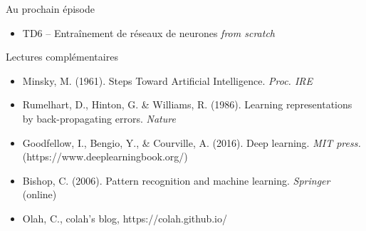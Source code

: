 \documentclass[12pt,dvipsnames,aspectratio=169]{beamer}
\begin{document}
\begin{frame}{Au prochain épisode}

    \begin{itemize}
        \item TD6 -- Entraînement de réseaux de neurones \textit{from scratch}
    \end{itemize}

    \begin{block}{Lectures complémentaires}

    \begin{itemize}
        \item Minsky, M. (1961). Steps Toward Artificial Intelligence.  \textit{Proc. IRE}
        \item Rumelhart, D., Hinton, G. & Williams, R. (1986). Learning representations by back-propagating errors. \textit{Nature}
        \item Goodfellow, I., Bengio, Y., & Courville, A. (2016). Deep learning. \textit{MIT press.} (https://www.deeplearningbook.org/)
        \item Bishop, C. (2006). Pattern recognition and machine learning. \textit{Springer} (online)
        \item Olah, C., colah's blog, https://colah.github.io/
    \end{itemize}


        
    \end{block}

\end{frame}
\end{document}
